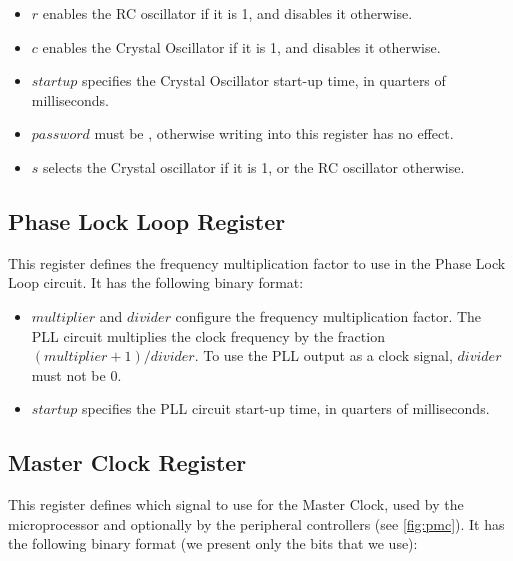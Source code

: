 \begin{flushright}
\end{flushright}

\begin{itemize}
  \item $r$ enables the RC oscillator if it is 1, and disables it otherwise.

  \item $c$ enables the Crystal Oscillator if it is 1, and disables it
  otherwise.

  \item $startup$ specifies the Crystal Oscillator start-up time, in quarters
  of milliseconds.

  \item $password$ must be , otherwise writing into this register has
  no effect.

  \item $s$ selects the Crystal oscillator if it is 1, or the RC oscillator
  otherwise.
\end{itemize}

\subsection{Phase Lock Loop Register}

This register defines the frequency multiplication factor to use in the Phase
Lock Loop circuit. It has the following binary format:

\begin{flushright}
\end{flushright}

\begin{itemize}
  \item $multiplier$ and $divider$ configure the frequency multiplication
  factor. The PLL circuit multiplies the clock frequency by the fraction
  $(multiplier+1) / divider$. To use the PLL output as a clock signal,
  $divider$ must not be 0.

  \item $startup$ specifies the PLL circuit start-up time, in quarters
  of milliseconds.
\end{itemize}

\subsection{Master Clock Register}

This register defines which signal to use for the Master Clock, used by the
microprocessor and optionally by the peripheral controllers (see
\cref{fig:pmc}). It has the following binary format (we present only the bits
that we use):

